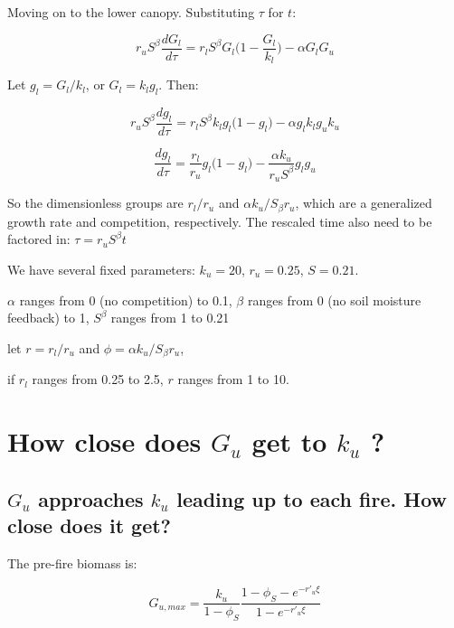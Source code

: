\documentclass{article}
\begin{document}
Moving on to the lower canopy.  Substituting $\tau$ for $t$:

\begin{equation*}
	 r_u S^\beta \frac{d G_l}{d \tau } = r_l S^\beta G_l \bigg(1-\frac{G_l}{k_l}\bigg) - \alpha G_l G_u
\end{equation*}

Let  $g_l = G_l/k_l$, or   $G_l =   k_l g_l$.  Then:

\begin{equation*}
r_u   S^\beta \frac{d g_l}{d \tau } = r_l S^\beta k_l g_l \big(1-g_l \big) - \alpha g_l k_l g_u k_u
\end{equation*}

\begin{equation*}
 \frac{d g_l}{d \tau } =\frac{ r_l}{r_u }  g_l \big(1-g_l \big) - \frac{\alpha k_u}{r_u  S^\beta}  g_l g_u
\end{equation*}

So the dimensionless groups are $r_l/r_u$ and $\alpha k_u / S_\beta r_u$, which are a generalized growth rate and competition, respectively.  The rescaled time also need to be factored in:  $\tau = r_u S^\beta t$


We have several fixed parameters:  $k_u = 20$, $r_u = 0.25$, $S=0.21$.

$\alpha$ ranges from 0 (no competition) to 0.1,
$\beta$ ranges from 0 (no soil moisture feedback) to 1, $S^\beta$ ranges from 1  to 0.21

let  $r = r_l/r_u$ and $\phi =  \alpha k_u / S_\beta r_u$,

if $r_l$ ranges from 0.25 to 2.5,  $r$ ranges from 1 to 10.



\section{How close does $G_u$ get to $k_u$ ?}
 \subsection{ $G_u$ approaches $k_u$  leading up to each fire. How close does it get?}

The  pre-fire biomass is:

\begin{equation}
  G_{u,max} =  \frac{k_u }{1-\phi_S}   \frac{1- \phi_S - e^{-r'_u \xi} }{1 - e^{-r'_u \xi}}
  \label{G_u_max}
\end{equation}
\end{document}
